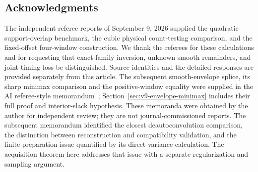 \subsection*{Acknowledgments}
The independent referee reports of September 9, 2026 supplied the
quadratic support-overlap benchmark, the cubic physical count-testing
comparison, and the fixed-offset four-window construction. We thank the
referees for these calculations and for requesting that exact-family
inversion, unknown smooth remainders, and joint timing loss be
distinguished. Source identities and the detailed responses are
provided separately from this article. The subsequent smooth-envelope
splice, its sharp minimax comparison and the positive-window equality
were supplied in the AI referee-style memorandum~\cite{A2ReviewV8};
Section~\ref{sec:v9-envelope-minimax} includes their full proof and
interior-slack hypothesis. These memoranda were obtained by the author
for independent review; they are not journal-commissioned reports. The subsequent memorandum
\cite{A2ReviewV9} identified the closest deautoconvolution comparison,
the distinction between reconstruction and compatibility validation,
and the finite-preparation issue quantified by its direct-variance
calculation. The acquisition theorem here addresses that issue with
a separate regularization and sampling argument.
\appendix





















